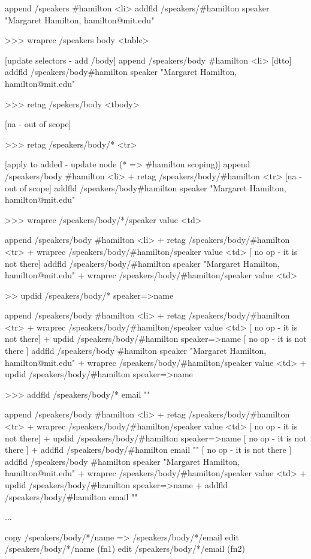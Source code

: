 \documentclass[sigconf,anonymous,screen]{acmart}
\begin{document}
append /speakers \#hamilton <li>
addfld /speakers/\#hamilton speaker "Margaret Hamilton, hamilton@mit.edu"

>>> wraprec /speakers body <table>

[update selectors - add /body]
append /speakers/body \#hamilton <li>
[dtto]
addfld /speakers/body\#hamilton speaker "Margaret Hamilton, hamilton@mit.edu"

>>> retag /spekers/body <tbody>

[na - out of scope]

>>> retag /speakers/body/* <tr>

[apply to added - update node (* => \#hamilton scoping)]
append /speakers/body \#hamilton <li>
+ retag /speakers/body/\#hamilton <tr>
[na - out of scope]
addfld /speakers/body\#hamilton speaker "Margaret Hamilton, hamilton@mit.edu"

>>> wraprec /speakers/body/*/speaker value <td>

append /speakers/body \#hamilton <li>
+ retag /speakers/body/\#hamilton <tr>
+ wraprec /speakers/body/\#hamilton/speaker value <td> [ no op - it is not there]
addfld /speakers/body/\#hamilton speaker "Margaret Hamilton, hamilton@mit.edu"
+ wraprec /speakers/body/\#hamilton/speaker value <td>

>> updid /speakers/body/* speaker=>name

append /speakers/body \#hamilton <li>
+ retag /speakers/body/\#hamilton <tr>
+ wraprec /speakers/body/\#hamilton/speaker value <td> [ no op - it is not there]
+ updid /speakers/body/\#hamilton speaker=>name [ no op - it is not there ]
addfld /speakers/body \#hamilton speaker "Margaret Hamilton, hamilton@mit.edu"
+ wraprec /speakers/body/\#hamilton/speaker value <td>
+ updid /speakers/body/\#hamilton speaker=>name

>>> addfld /speakers/body/* email ""

append /speakers/body \#hamilton <li>
+ retag /speakers/body/\#hamilton <tr>
+ wraprec /speakers/body/\#hamilton/speaker value <td> [ no op - it is not there]
+ updid /speakers/body/\#hamilton speaker=>name [ no op - it is not there ]
+ addfld /speakers/body/\#hamilton email "" [ no op - it is not there ]
addfld /speakers/body \#hamilton speaker "Margaret Hamilton, hamilton@mit.edu"
+ wraprec /speakers/body/\#hamilton/speaker value <td>
+ updid /speakers/body/\#hamilton speaker=>name
+ addfld /speakers/body/\#hamilton email ""

...

copy /speakers/body/*/name => /speakers/body/*/email
edit /speakers/body/*/name (fn1)
edit /speakers/body/*/email (fn2)
\end{document}
